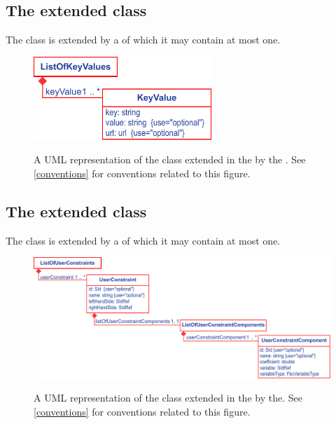 \subsection{The extended  class}
\label{sbase-class-kv}

The \SBML \SBase class is extended by a  of which it may contain at most one.
%
\begin{figure}[ht]
  \centering
  \includegraphics[width=0.6\textwidth]{images/fbc_v3_uml_keyvalue.pdf}\\
  \caption{A UML representation of the \SBML \SBase class extended in
  the \FBCPackage by the \ListOfKeyValues. See \ref{conventions} for conventions related to this
  figure.}
  \label{fig:fbc_v3_uml_keyvalue}
\end{figure}


\subsection{The extended  class}
\label{model-class-kv}

The \SBML \Model class is extended by a  of which it may contain at most one.
%
\begin{figure}[ht]
  \centering
  \includegraphics[width=\textwidth]{images/fbc_v3_uml_userconstraint.pdf}\\
  \caption{A UML representation of the \SBML \Model class extended in
  the \FBCPackage by the\ListOfUserConstraints. See \ref{conventions} for conventions related to this
  figure.}
  \label{fig:fbc_v3_uml_user_constraints}
\end{figure}

